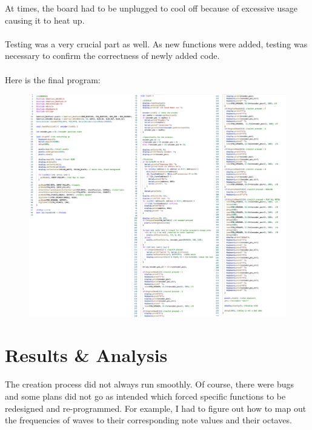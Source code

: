 \documentclass{article}
\begin{document}
At times, the board had to be unplugged to cool off because of excessive usage causing it to heat up.\\\\

Testing was a very crucial part as well. As new functions were added, testing was necessary to confirm the correctness of newly added code. \\\\

Here is the final program:\\

\begin{figure}[H]
    \centering
    \includegraphics[width=\textwidth]{images/CODE.png}
\end{figure}

\section{Results \& Analysis}

\hspace{1cm} The creation process did not always run smoothly. Of course, there were bugs and some plans did not go as intended which forced specific functions to be redesigned and re-programmed. For example, I had to figure out how to map out the frequencies of waves to their corresponding note values and their octaves.\\\\
\end{document}
